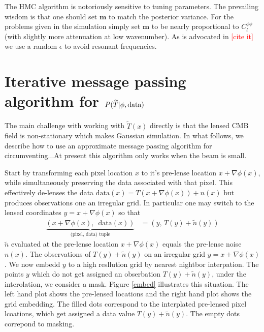 \documentclass[noinfoline]{imsart}
\newcommand{\bs}{\boldsymbol}
\begin{document}
The HMC algorithm is notoriously sensitive to tuning parameters. 
The prevailing wisdom is that one should set $\bs m$ to match the posterior variance. For the problems given in the simulation simply set  $\bs m$ to be nearly proportional  to $C_l^{\phi\phi}$ (with slightly more attenuation at low wavenumber).  As is advocated in \textcolor{red}{[cite it]} we  use a random $\epsilon$ to avoid resonant frequencies.

%
%
\section{Iterative message passing algorithm for $ P(\widetilde T |  \phi,\text{\rm data})$}
\label{Section: iterative message passing section}



The main challenge with working with $\widetilde T(x)$ directly is that the lensed CMB field is non-stationary which makes Gaussian simulation. In what follows, we describe how to use an approximate message passing algorithm for circumventing...At present this algorithm only works when the beam is small.



Start by  transforming each pixel location $x$ to it's pre-lense location $x+\nabla \phi(x)$, while simultaneously preserving the data associated with that pixel. This  effectively de-lenses the data $\text{data}(x) = T(x+\nabla \phi(x))+n(x)$ but produces observations one an irregular grid. In particular one may switch to the lensed coordinates $y = x+\nabla\phi(x)$ so that
\begin{align}
\nonumber
\underbrace{(x +\nabla \phi(x),\, \text{ data}(x))}_{\text{(pixel, data) tuple}} & = (y, \, T(y) + \tilde n(y)) 
\end{align}
$\tilde n$ evaluated at the pre-lense location $x+\nabla\phi(x)$ equals  the pre-lense noise $n(x)$.
The observations of $T(y)+\tilde n(y)$ on an irregular grid $y = x +\nabla \phi(x)$.  We now embedd  $y$  to a high resllution grid by nearest nightbor interpation. The points $y$ which do not get assigned an obserbation $T(y)+\tilde n(y)$, under the interolation, we consider a mask. 
Figure \ref{embed} illustrates this situation. The left hand plot shows the pre-lensed locations and the right hand plot shows the grid embedding. The filled dots correspond to the interplated pre-lensed pixel lcoations, which get assigned a data value $T(y) + \tilde n(y)$. The empty dots correpond to masking. 
\end{document}
